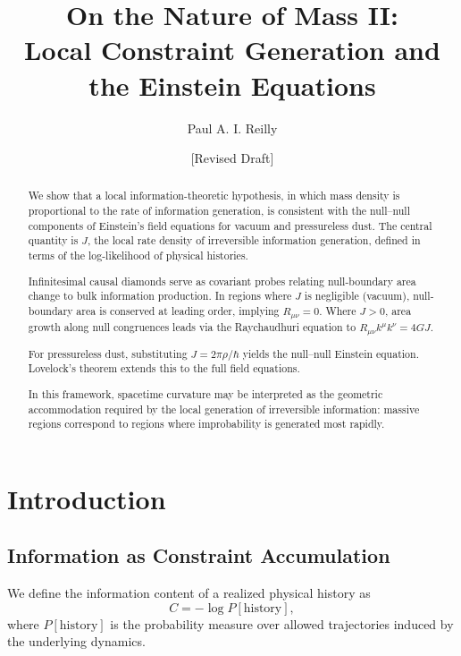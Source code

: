\documentclass[12pt]{article}
\title{On the Nature of Mass II:\\
Local Constraint Generation and the Einstein Equations}
\author{Paul A. I. Reilly}
\date{[Revised Draft]}
\begin{document}
\maketitle

\begin{abstract}

We show that a local information-theoretic hypothesis, 
in which mass density is proportional to the 
rate of information generation, is consistent with the null–null 
components of Einstein’s field equations for vacuum and pressureless dust. 
The central quantity is $J$, the local rate density of
irreversible information generation, defined in terms of the
log-likelihood of physical histories.

Infinitesimal causal diamonds serve as covariant probes relating
null-boundary area change to bulk information production.
In regions where $J$ is negligible (vacuum), null-boundary area is
conserved at leading order, implying $R_{\mu\nu}=0$.
Where $J>0$, area growth along null congruences leads via the
Raychaudhuri equation to $R_{\mu\nu}k^\mu k^\nu = 4G J$.

For pressureless dust, substituting $J = 2\pi \rho / \hbar$
yields the null--null Einstein equation. Lovelock's theorem
extends this to the full field equations.

In this framework, spacetime curvature may be interpreted as the
geometric accommodation required by the local generation of
irreversible information: massive regions correspond to regions
where improbability is generated most rapidly.

\end{abstract}

\section{Introduction}

\subsection{Information as Constraint Accumulation}

We define the information content of a realized physical history as
\begin{equation}
C = -\log P[\text{history}],
\end{equation}
where $P[\text{history}]$ is the probability measure over
allowed trajectories induced by the underlying dynamics.
\end{document}
